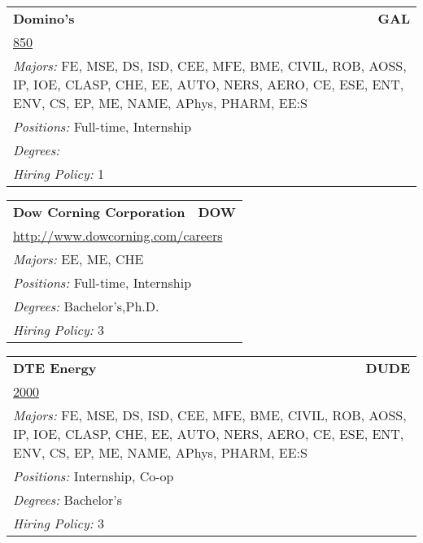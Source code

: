\documentclass[twoside]{article}
\begin{document}
\begin{center}
\begin{multicols}{3}
\begin{FlushLeft}
\begin{minipage}{.9\columnwidth}\begin{tabularx}{.95\columnwidth}{Xr}
                 {\Large\bf Domino's} & {\Large\bf GAL}\\
    \multicolumn{2}{p{.95\columnwidth}}{\url{850}}\\
    \multicolumn{2}{p{.95\columnwidth}}{\emph{Majors:} FE, MSE, DS, ISD, CEE, MFE, BME, CIVIL, ROB, AOSS, IP, IOE, CLASP, CHE, EE, AUTO, NERS, AERO, CE, ESE, ENT, ENV, CS, EP, ME, NAME, APhys, PHARM, EE:S}\\
    \multicolumn{2}{p{.95\columnwidth}}{\emph{Positions:} Full-time, Internship}\\
    \multicolumn{2}{p{.95\columnwidth}}{\emph{Degrees:} }\\
    \multicolumn{2}{p{.95\columnwidth}}{\emph{Hiring Policy:} 1}\\
    \end{tabularx}
    
\end{minipage}
 
\begin{minipage}{.9\columnwidth}\begin{tabularx}{.95\columnwidth}{Xr}
                 {\Large\bf Dow Corning Corporation} & {\Large\bf DOW}\\
    \multicolumn{2}{p{.95\columnwidth}}{\url{http://www.dowcorning.com/careers}}\\
    \multicolumn{2}{p{.95\columnwidth}}{\emph{Majors:} EE, ME, CHE}\\
    \multicolumn{2}{p{.95\columnwidth}}{\emph{Positions:} Full-time, Internship}\\
    \multicolumn{2}{p{.95\columnwidth}}{\emph{Degrees:} Bachelor's,Ph.D.}\\
    \multicolumn{2}{p{.95\columnwidth}}{\emph{Hiring Policy:} 3}\\
    \end{tabularx}
    
\end{minipage}
 
\begin{minipage}{.9\columnwidth}\begin{tabularx}{.95\columnwidth}{Xr}
                 {\Large\bf DTE Energy} & {\Large\bf DUDE}\\
    \multicolumn{2}{p{.95\columnwidth}}{\url{2000}}\\
    \multicolumn{2}{p{.95\columnwidth}}{\emph{Majors:} FE, MSE, DS, ISD, CEE, MFE, BME, CIVIL, ROB, AOSS, IP, IOE, CLASP, CHE, EE, AUTO, NERS, AERO, CE, ESE, ENT, ENV, CS, EP, ME, NAME, APhys, PHARM, EE:S}\\
    \multicolumn{2}{p{.95\columnwidth}}{\emph{Positions:} Internship, Co-op}\\
    \multicolumn{2}{p{.95\columnwidth}}{\emph{Degrees:} Bachelor's}\\
    \multicolumn{2}{p{.95\columnwidth}}{\emph{Hiring Policy:} 3}\\
    \end{tabularx}
    

\end{minipage}
\end{FlushLeft}
\end{multicols}
\end{center}
\end{document}
